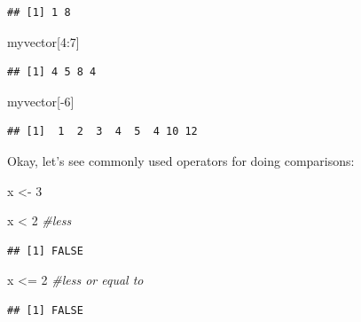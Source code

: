 \documentclass[
]{book}
\newenvironment{Shaded}{\begin{snugshade}}{\end{snugshade}}
\newcommand{\CommentTok}[1]{\textcolor[rgb]{0.56,0.35,0.01}{\textit{#1}}}
\newcommand{\DecValTok}[1]{\textcolor[rgb]{0.00,0.00,0.81}{#1}}
\newcommand{\NormalTok}[1]{#1}
\newcommand{\OtherTok}[1]{\textcolor[rgb]{0.56,0.35,0.01}{#1}}
\newcommand{\SpecialCharTok}[1]{\textcolor[rgb]{0.00,0.00,0.00}{#1}}
\theoremstyle{definition}
\theoremstyle{definition}
\theoremstyle{definition}
\theoremstyle{definition}
\theoremstyle{remark}
\begin{document}
\begin{verbatim}
## [1] 1 8
\end{verbatim}

\begin{Shaded}
\begin{Highlighting}[]
\NormalTok{myvector[}\DecValTok{4}\SpecialCharTok{:}\DecValTok{7}\NormalTok{]}
\end{Highlighting}
\end{Shaded}

\begin{verbatim}
## [1] 4 5 8 4
\end{verbatim}

\begin{Shaded}
\begin{Highlighting}[]
\NormalTok{myvector[}\SpecialCharTok{{-}}\DecValTok{6}\NormalTok{]}
\end{Highlighting}
\end{Shaded}

\begin{verbatim}
## [1]  1  2  3  4  5  4 10 12
\end{verbatim}

Okay, let's see commonly used operators for doing comparisons:

\begin{Shaded}
\begin{Highlighting}[]
\NormalTok{x }\OtherTok{\textless{}{-}} \DecValTok{3}
\end{Highlighting}
\end{Shaded}

\begin{Shaded}
\begin{Highlighting}[]
\NormalTok{x }\SpecialCharTok{\textless{}} \DecValTok{2}      \CommentTok{\#less}
\end{Highlighting}
\end{Shaded}

\begin{verbatim}
## [1] FALSE
\end{verbatim}

\begin{Shaded}
\begin{Highlighting}[]
\NormalTok{x }\SpecialCharTok{\textless{}=} \DecValTok{2}     \CommentTok{\#less or equal to}
\end{Highlighting}
\end{Shaded}

\begin{verbatim}
## [1] FALSE
\end{verbatim}
\end{document}
